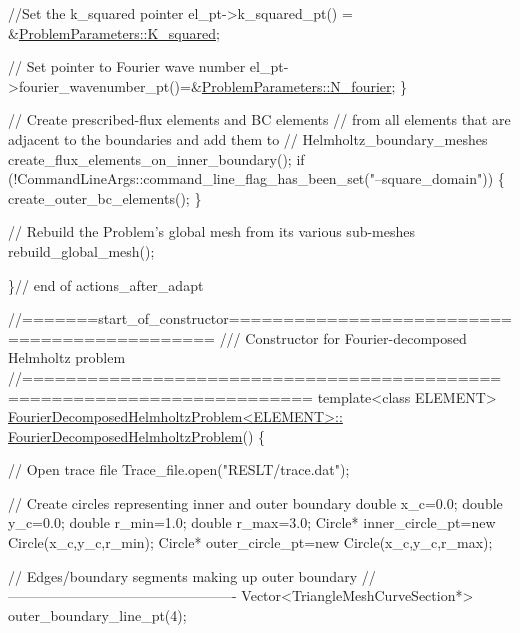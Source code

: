 \begin{DoxyCodeInclude}
   \textcolor{comment}{//Set the k\_squared  pointer}
   el\_pt->k\_squared\_pt() = &\hyperlink{namespaceProblemParameters_aa5362de1af9e257fde4317c367158a93}{ProblemParameters::K\_squared};

   \textcolor{comment}{// Set pointer to Fourier wave number}
   el\_pt->fourier\_wavenumber\_pt()=&\hyperlink{namespaceProblemParameters_aaa674958a1ca6ee0b99de3377288c93f}{ProblemParameters::N\_fourier};
  \}

 \textcolor{comment}{// Create prescribed-flux elements and BC elements }
 \textcolor{comment}{// from all elements that are adjacent to the boundaries and add them to }
 \textcolor{comment}{// Helmholtz\_boundary\_meshes}
 create\_flux\_elements\_on\_inner\_boundary();
 \textcolor{keywordflow}{if} (!CommandLineArgs::command\_line\_flag\_has\_been\_set(\textcolor{stringliteral}{"--square\_domain"}))
  \{
   create\_outer\_bc\_elements();
  \}

 \textcolor{comment}{// Rebuild the Problem's global mesh from its various sub-meshes}
 rebuild\_global\_mesh();
  
\}\textcolor{comment}{// end of actions\_after\_adapt}


\textcolor{comment}{//=======start\_of\_constructor=============================================}\textcolor{comment}{}
\textcolor{comment}{/// Constructor for Fourier-decomposed Helmholtz problem}
\textcolor{comment}{}\textcolor{comment}{//========================================================================}
\textcolor{keyword}{template}<\textcolor{keyword}{class} ELEMENT>
\hyperlink{classFourierDecomposedHelmholtzProblem_ab368ed8fe04d4e3db67d13bab9e7b52e}{FourierDecomposedHelmholtzProblem<ELEMENT>::}
\hyperlink{classFourierDecomposedHelmholtzProblem_ab368ed8fe04d4e3db67d13bab9e7b52e}{FourierDecomposedHelmholtzProblem}()
\{ 

 \textcolor{comment}{// Open trace file}
 Trace\_file.open(\textcolor{stringliteral}{"RESLT/trace.dat"});
 
 \textcolor{comment}{// Create circles representing inner and outer boundary}
 \textcolor{keywordtype}{double} x\_c=0.0;
 \textcolor{keywordtype}{double} y\_c=0.0;
 \textcolor{keywordtype}{double} r\_min=1.0;
 \textcolor{keywordtype}{double} r\_max=3.0;
 Circle* inner\_circle\_pt=\textcolor{keyword}{new} Circle(x\_c,y\_c,r\_min);
 Circle* outer\_circle\_pt=\textcolor{keyword}{new} Circle(x\_c,y\_c,r\_max);
 
 \textcolor{comment}{// Edges/boundary segments making up outer boundary}
 \textcolor{comment}{//-------------------------------------------------}
 Vector<TriangleMeshCurveSection*> outer\_boundary\_line\_pt(4);
 

\end{DoxyCodeInclude}
